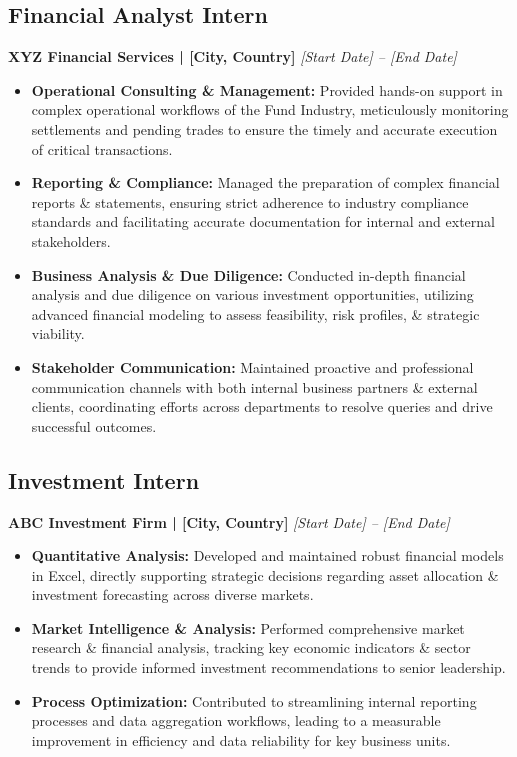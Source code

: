 \documentclass{article}
\begin{document}
\subsection{Financial Analyst Intern}
\textbf{XYZ Financial Services | [City, Country]} \hfill \textit{[Start Date] – [End Date]}
\begin{itemize}
    \item \textbf{Operational Consulting \& Management:} Provided hands-on support in complex operational workflows of the Fund Industry, meticulously monitoring settlements and pending trades to ensure the timely and accurate execution of critical transactions.
    \item \textbf{Reporting \& Compliance:} Managed the preparation of complex financial reports \& statements, ensuring strict adherence to industry compliance standards and facilitating accurate documentation for internal and external stakeholders.
    \item \textbf{Business Analysis \& Due Diligence:} Conducted in-depth financial analysis and due diligence on various investment opportunities, utilizing advanced financial modeling to assess feasibility, risk profiles, \& strategic viability.
    \item \textbf{Stakeholder Communication:} Maintained proactive and professional communication channels with both internal business partners \& external clients, coordinating efforts across departments to resolve queries and drive successful outcomes.
\end{itemize}

\subsection{Investment Intern}
\textbf{ABC Investment Firm | [City, Country]} \hfill \textit{[Start Date] – [End Date]}
\begin{itemize}
    \item \textbf{Quantitative Analysis:} Developed and maintained robust financial models in Excel, directly supporting strategic decisions regarding asset allocation \& investment forecasting across diverse markets.
    \item \textbf{Market Intelligence \& Analysis:} Performed comprehensive market research \& financial analysis, tracking key economic indicators \& sector trends to provide informed investment recommendations to senior leadership.
    \item \textbf{Process Optimization:} Contributed to streamlining internal reporting processes and data aggregation workflows, leading to a measurable improvement in efficiency and data reliability for key business units.
\end{itemize}
\end{document}
